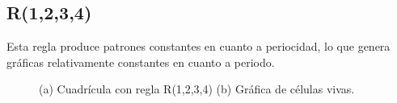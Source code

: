 \subsection{R(1,2,3,4)}
Esta regla produce patrones constantes en cuanto a periocidad, lo que genera gráficas relativamente constantes en cuanto a periodo.
\begin{figure}[h]
	\centering
	\caption{(a) Cuadrícula con regla R(1,2,3,4) (b) Gráfica de células vivas.}
	\label{fig:R1234}
\end{figure}
\newpage
